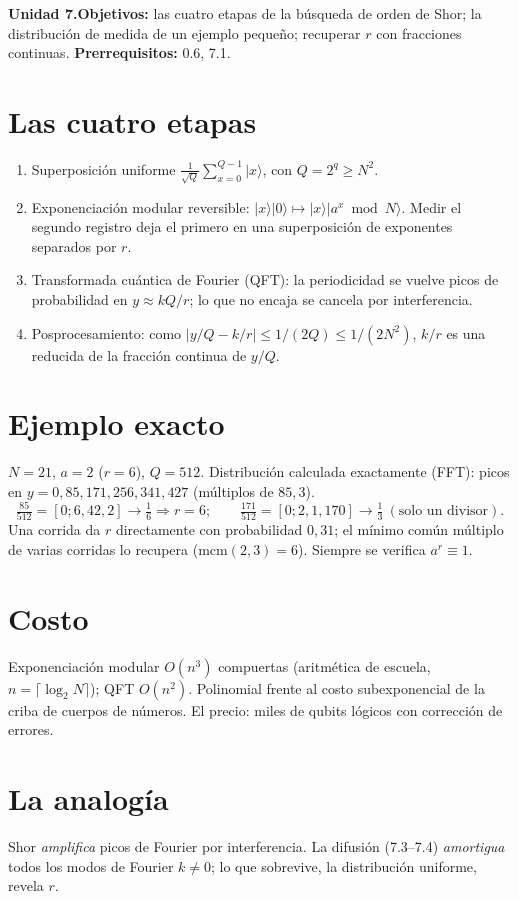\documentclass[11pt,a4paper]{article}
\begin{document}

\noindent\textbf{Unidad 7.}\quad\textbf{Objetivos:} las cuatro etapas de la búsqueda de orden de Shor; la distribución de medida de un ejemplo pequeño;
recuperar $r$ con fracciones continuas.
\textbf{Prerrequisitos:} 0.6, 7.1.

\section{Las cuatro etapas}
\begin{enumerate}[nosep]
\item Superposición uniforme $\frac1{\sqrt Q}\sum_{x=0}^{Q-1}|x\rangle$, con $Q=2^q\ge N^2$.
\item Exponenciación modular reversible: $|x\rangle|0\rangle\mapsto|x\rangle|a^x\bmod N\rangle$. Medir el segundo registro deja el primero en una superposición de
exponentes separados por $r$.
\item Transformada cuántica de Fourier (QFT): la periodicidad se vuelve picos de probabilidad en $y\approx kQ/r$; lo que no encaja se cancela por interferencia.
\item Posprocesamiento: como $|y/Q-k/r|\le1/(2Q)\le1/(2N^2)$, $k/r$ es una reducida de la fracción continua de $y/Q$.
\end{enumerate}

\section{Ejemplo exacto \evS}
$N=21$, $a=2$ ($r=6$), $Q=512$. Distribución calculada exactamente (FFT): picos en $y=0,85,171,256,341,427$ (múltiplos de $85{,}3$).
\[\tfrac{85}{512}=[0;6,42,2]\to\tfrac16\Rightarrow r=6;\qquad\tfrac{171}{512}=[0;2,1,170]\to\tfrac13\ (\text{solo un divisor}).\]
Una corrida da $r$ directamente con probabilidad $0{,}31$; el mínimo común múltiplo de varias corridas lo recupera ($\mathrm{mcm}(2,3)=6$). Siempre se verifica $a^r\equiv1$.

\section{Costo}
Exponenciación modular $O(n^3)$ compuertas (aritmética de escuela, $n=\lceil\log_2N\rceil$); QFT $O(n^2)$. Polinomial frente al costo subexponencial de la criba
de cuerpos de números. El precio: miles de qubits lógicos con corrección de errores.

\section{La analogía}
Shor \emph{amplifica} picos de Fourier por interferencia. La difusión (7.3--7.4) \emph{amortigua} todos los modos de Fourier $k\ne0$; lo que sobrevive, la
distribución uniforme, revela $r$.
\end{document}
